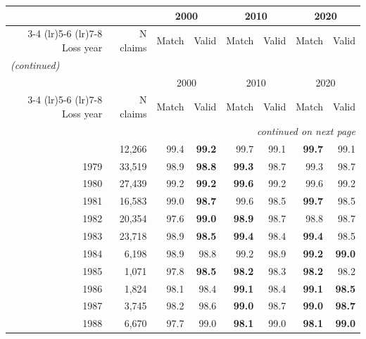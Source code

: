 {\small\setlength{\tabcolsep}{4pt}
\begin{longtable}{rrrrrrrr}
\toprule
 &  & \multicolumn{2}{c}{2000} & \multicolumn{2}{c}{2010} & \multicolumn{2}{c}{2020} \\
\cmidrule(lr){3-4} \cmidrule(lr){5-6} \cmidrule(lr){7-8}
Loss year & N claims & Match & Valid & Match & Valid & Match & Valid \\
\midrule
\endfirsthead
\multicolumn{8}{l}{\itshape (continued)}\\
\toprule
 &  & \multicolumn{2}{c}{2000} & \multicolumn{2}{c}{2010} & \multicolumn{2}{c}{2020} \\
\cmidrule(lr){3-4} \cmidrule(lr){5-6} \cmidrule(lr){7-8}
Loss year & N claims & Match & Valid & Match & Valid & Match & Valid \\
\midrule
\endhead
\midrule
\multicolumn{8}{r}{\itshape continued on next page}\\
\endfoot
\endlastfoot
1978 & 12,266 & \cellcolor{gray!15}99.4 & \cellcolor{gray!15}\textbf{99.2} & 99.7 & 99.1 & \textbf{99.7} & 99.1 \\
1979 & 33,519 & \cellcolor{gray!15}98.9 & \cellcolor{gray!15}\textbf{98.8} & \textbf{99.3} & 98.7 & 99.3 & 98.7 \\
1980 & 27,439 & \cellcolor{gray!15}99.2 & \cellcolor{gray!15}\textbf{99.2} & \textbf{99.6} & 99.2 & 99.6 & 99.2 \\
1981 & 16,583 & \cellcolor{gray!15}99.0 & \cellcolor{gray!15}\textbf{98.7} & 99.6 & 98.5 & \textbf{99.7} & 98.5 \\
1982 & 20,354 & \cellcolor{gray!15}97.6 & \cellcolor{gray!15}\textbf{99.0} & \textbf{98.9} & 98.7 & 98.8 & 98.7 \\
1983 & 23,718 & \cellcolor{gray!15}98.9 & \cellcolor{gray!15}\textbf{98.5} & \textbf{99.4} & 98.4 & \textbf{99.4} & 98.5 \\
1984 & 6,198 & \cellcolor{gray!15}98.9 & \cellcolor{gray!15}98.8 & 99.2 & 98.9 & \textbf{99.2} & \textbf{99.0} \\
1985 & 1,071 & \cellcolor{gray!15}97.8 & \cellcolor{gray!15}\textbf{98.5} & \textbf{98.2} & 98.3 & \textbf{98.2} & 98.2 \\
1986 & 1,824 & \cellcolor{gray!15}98.1 & \cellcolor{gray!15}98.4 & \textbf{99.1} & 98.4 & \textbf{99.1} & \textbf{98.5} \\
1987 & 3,745 & \cellcolor{gray!15}98.2 & \cellcolor{gray!15}98.6 & \textbf{99.0} & 98.7 & \textbf{99.0} & \textbf{98.7} \\
1988 & 6,670 & \cellcolor{gray!15}97.7 & \cellcolor{gray!15}99.0 & \textbf{98.1} & 99.0 & \textbf{98.1} & \textbf{99.0} \\

\end{longtable}}
